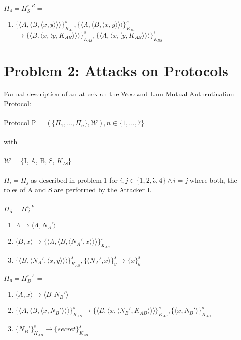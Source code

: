 \documentclass[12pt,pdftex,a4paper]{article}
\newcommand\tab[1][1cm]{\hspace*{#1}}
\begin{document}
$\Pi_4 = \Pi_S^{r,B} =$
\begin{enumerate}
\item \tab $ \{\langle A, \langle B, \langle x, y\rangle\rangle\rangle\}_{K_{AS}}^s, \{\langle A, \langle B, \langle x, y\rangle\rangle\rangle\}_{K_{BS}}^s $ \\ \tab $\rightarrow \{\langle B, \langle x, \langle y, K_{AB}\rangle\rangle\rangle\}_{K_{AS}}^s,\{\langle A, \langle x, \langle y, K_{AB}\rangle\rangle\rangle\}_{K_{BS}}^s $
\end{enumerate}

\newpage
\section*{Problem 2: Attacks on Protocols}
Formal description of an attack on the Woo and Lam Mutual Authentication Protocol:\\~\\
Protocol P = $(\{\Pi_1, ..., \Pi_n\}, \mathcal{W}), n \in \{1,...,7\}$ \\~\\
with\\~\\
$\mathcal{W}$ = \{I, A, B, S, $K_{IS}$\}\\~\\
$\Pi_i = \Pi_j$ as described in problem 1 for $i,j\in \{1,2,3,4\}\land i=j$ where both, the roles of A and S are performed by the Attacker I.\\~\\

$\Pi_5 = \Pi_A^{i,B} =$
\begin{enumerate}
	\item \tab $ A \rightarrow \langle A, N_A'\rangle $
	\item \tab $ \langle B, x \rangle \rightarrow \{\langle A, \langle B, \langle N_A', x\rangle\rangle\rangle\}_{K_{AS}}^s$	
	\item \tab $ \{\langle B,\langle N_A', \langle x, y\rangle\rangle\rangle\}_{K_{AS}}^{s}, \{\langle N_A', x\rangle\}_y^s \rightarrow \{x\}_y^s $
\end{enumerate}

$\Pi_6 = \Pi_B^{r,A} =$
\begin{enumerate}
\item \tab $\langle A, x\rangle \rightarrow \langle B, N_B' \rangle$
\item \tab $\{\langle A, \langle B, \langle x, N_B' \rangle\rangle\rangle\}_{K_{AS}}^s
\rightarrow \{\langle B,\langle x, \langle N_B', K_{AB}\rangle\rangle\rangle\}_{K_{AS}}^{s}, \{\langle x, N_B'\rangle\}_{K_{AB}}^s$
\item \tab $ \{N_B'\}_{K_{AB}}^s \rightarrow \{secret\}_{K_{AB}}^s$
\end{enumerate}
\end{document}
